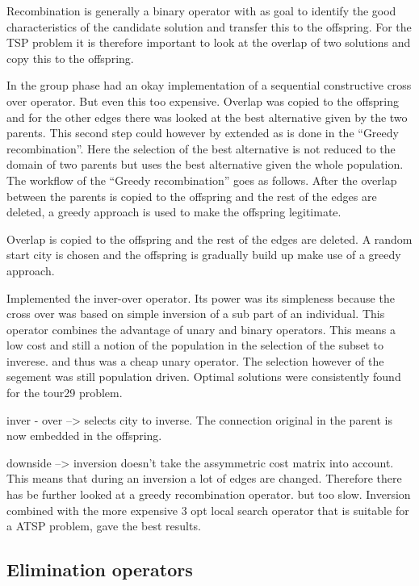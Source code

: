 \documentclass[a4paper,10pt]{article}
\begin{document}
Recombination is generally a binary operator with as goal to identify the good characteristics of the candidate solution and transfer this to the offspring. For the TSP problem it is therefore important to look at the overlap of two solutions and copy this to the offspring. 

In the group phase had an okay implementation of a sequential constructive cross over operator. But even this too expensive. Overlap was copied to the offspring and for the other edges there was looked at the best alternative given by the two parents. This second step could however by extended as is done in the ``Greedy recombination''. Here the selection of the best alternative is not reduced to the domain of two parents but uses the best alternative given the whole population. The workflow of the ``Greedy recombination'' goes as follows. After the overlap between the parents is copied to the offspring and the rest of the edges are deleted, a greedy approach is used to make the offspring legitimate.  

Overlap is copied to the offspring and the rest of the edges are deleted. A random start city is chosen and the offspring is gradually build up make use of a greedy approach. 

Implemented the inver-over operator. Its power was its simpleness because the cross over was based on simple inversion of a sub part of an individual. This operator combines the advantage of unary and binary operators. This means a low cost and still a notion of the population in the selection of the subset to inverese. and thus was a cheap unary operator. The selection however of the segement was still population driven. Optimal solutions were consistently found for the tour29 problem. 

inver - over --> selects city to inverse. The connection original in the parent is now embedded in the offspring. 

downside --> inversion doesn't take the assymmetric cost matrix into account. This means that during an inversion a lot of edges are changed. Therefore there has be further looked at a greedy recombination operator. but too slow. Inversion combined with the more expensive 3 opt local search operator that is suitable for a ATSP problem, gave the best results. 





\subsection{Elimination operators}
\end{document}
